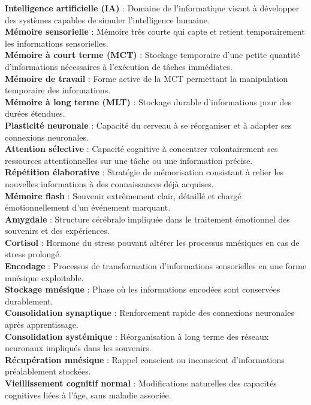 \documentclass[11pt,a4paper]{report}
\begin{document}
\textbf{Intelligence artificielle (IA)} : Domaine de l'informatique visant à développer des systèmes capables de simuler l'intelligence humaine.\\
\textbf{Mémoire sensorielle} : Mémoire très courte qui capte et retient temporairement les informations sensorielles.\\
\textbf{Mémoire à court terme (MCT)} : Stockage temporaire d'une petite quantité d'informations nécessaires à l'exécution de tâches immédiates.\\
\textbf{Mémoire de travail} : Forme active de la MCT permettant la manipulation temporaire des informations.\\
\textbf{Mémoire à long terme (MLT)} : Stockage durable d'informations pour des durées étendues.\\
\textbf{Plasticité neuronale} : Capacité du cerveau à se réorganiser et à adapter ses connexions neuronales.\\
\textbf{Attention sélective} : Capacité cognitive à concentrer volontairement ses ressources attentionnelles sur une tâche ou une information précise.\\
\textbf{Répétition élaborative} : Stratégie de mémorisation consistant à relier les nouvelles informations à des connaissances déjà acquises.\\
\textbf{Mémoire flash} : Souvenir extrêmement clair, détaillé et chargé émotionnellement d’un événement marquant.\\
\textbf{Amygdale} : Structure cérébrale impliquée dans le traitement émotionnel des souvenirs et des expériences.\\
\textbf{Cortisol} : Hormone du stress pouvant altérer les processus mnésiques en cas de stress prolongé.\\
\textbf{Encodage} : Processus de transformation d'informations sensorielles en une forme mnésique exploitable.\\
\textbf{Stockage mnésique} : Phase où les informations encodées sont conservées durablement.\\
\textbf{Consolidation synaptique} : Renforcement rapide des connexions neuronales après apprentissage.\\
\textbf{Consolidation systémique} : Réorganisation à long terme des réseaux neuronaux impliqués dans les souvenirs.\\
\textbf{Récupération mnésique} : Rappel conscient ou inconscient d'informations préalablement stockées.\\
\textbf{Vieillissement cognitif normal} : Modifications naturelles des capacités cognitives liées à l’âge, sans maladie associée.\\
\end{document}

